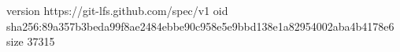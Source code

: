 version https://git-lfs.github.com/spec/v1
oid sha256:89a357b3beda99f8ae2484ebbe90c958e5e9bbd138e1a82954002aba4b4178e6
size 37315
